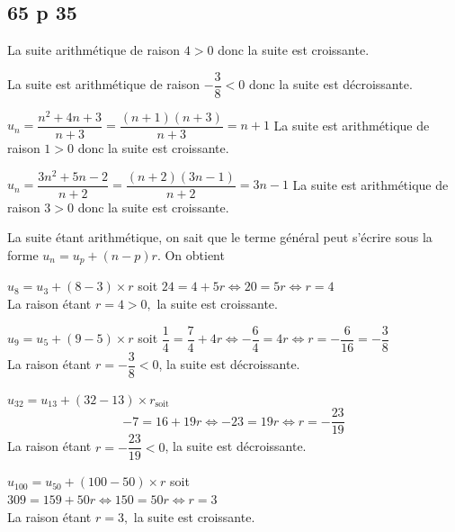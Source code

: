 \documentclass[a4paper,french]{book}
\begin{document}
\subsection*{65 p 35}
\begin{enumMet}
    \item \begin{enumMet}
        \item La suite arithmétique de raison $4>0$ donc la suite est croissante.
        \item La suite est arithmétique de raison $-\dfrac{3}{8}<0$ donc la suite est décroissante.
        \item $u_{n}=\dfrac{n^{2}+4 n+3}{n+3}=\dfrac{(n+1)(n+3)}{n+3}=n+1$
        La suite est arithmétique de raison $1>0$ donc la suite est croissante.
        \item $u_{n}=\dfrac{3 n^{2}+5 n-2}{n+2}=\dfrac{(n+2)(3 n-1)}{n+2}=3 n-1$
        La suite est arithmétique de raison $3>0$ donc la suite est croissante.
    \end{enumMet}
    \item La suite étant arithmétique, on sait que le terme général peut s'écrire sous la forme $u_{n}=u_{p}+(n-p) r$. On obtient
    \begin{enumMet}
        \item $u_{8}=u_{3}+(8-3) \times r$ soit $24=4+5 r \Longleftrightarrow 20=5 r \Longleftrightarrow r=4$\\
        La raison étant $r=4>0,$ la suite est croissante.\\
        \item $u_{9}=u_{5}+(9-5) \times r$ soit
        $\dfrac{1}{4}=\dfrac{7}{4}+4 r \Longleftrightarrow-\dfrac{6}{4}=4 r \Longleftrightarrow r=-\dfrac{6}{16}=-\dfrac{3}{8}$\\
        La raison étant $r=-\dfrac{3}{8}<0$, la suite est décroissante.
        \item $u_{32}=u_{13}+(32-13) \times r_{\text {soit }}$
        $$
        -7=16+19 r \Longleftrightarrow-23=19 r \Longleftrightarrow r=-\dfrac{23}{19}
        $$
        La raison étant $r=-\dfrac{23}{19}<0$, la suite est décroissante.
        \item $u_{100}=u_{50}+(100-50) \times r$ soit\\
        $309=159+50 r \Longleftrightarrow 150=50 r \Longleftrightarrow r=3$\\
        La raison étant $r=3,$ la suite est croissante.
    \end{enumMet}
\end{enumMet}
\end{document}
